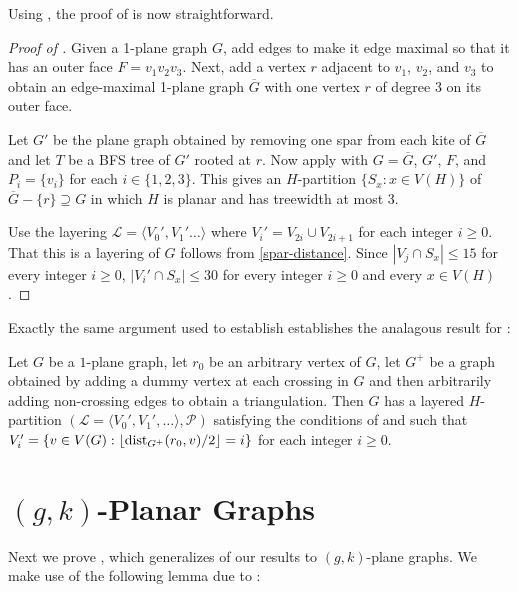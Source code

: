 \documentclass{patmorin}
\DeclareMathOperator{\dist}{dist}
\begin{document}
Using , the proof of  is now straightforward. 

\begin{proof}[Proof of ]
Given a 1-plane graph $G$, add edges to make it edge maximal so that it has an outer face $F=v_1v_2v_3$. Next, add a vertex $r$ adjacent to $v_1$, $v_2$, and $v_3$ to obtain an edge-maximal 1-plane graph $\overline{G}$ with one vertex $r$ of degree 3 on its outer face. 
  
  Let $G'$ be the plane graph obtained by removing one spar from each kite of $\overline{G}$ and let $T$ be a BFS tree of $G'$ rooted at $r$.  Now apply  with $G=\overline{G}$, $G'$, $F$, and $P_i=\{v_i\}$ for each $i\in\{1,2,3\}$.  This gives an $H$-partition $\{S_x:x\in V(H)\}$ of $\overline{G}-\{r\}\supseteq G$ in which $H$ is planar and has treewidth at most 3.
  
  Use the layering $\mathcal{L}=\langle V_0',V_1'\ldots\rangle$ where $V_i'=V_{2i}\cup V_{2i+1}$ for each integer $i\ge 0$. That this is a layering of $G$ follows from \eqref{spar-distance}.  Since $|V_j\cap S_x|\le 15$ for every integer $i\ge 0$, $|V_i'\cap S_x|\le 30$ for every integer $i\ge 0$ and every $x\in V(H)$.
\end{proof}


Exactly the same argument used to establish  establishes the analagous result for :

\begin{cor}
  Let $G$ be a $1$-plane graph, let $r_0$ be an arbitrary vertex of $G$, let $G^+$ be a graph obtained by adding a dummy vertex at each crossing in $G$ and then arbitrarily adding non-crossing edges to obtain a triangulation.  Then $G$ has a layered $H$-partition $(\mathcal{L}=\langle V_0',V_1',\ldots\rangle,\mathcal{P})$ satisfying the conditions of  and such that $V_i' = \{v\in V(G): \floor{\dist_{G^+}(r_0,v)/2}=i\}$ for each integer $i\ge 0$.
\end{cor}


\section{$(g,k)$-Planar Graphs}

Next we prove , which generalizes of our results to $(g,k)$-plane graphs.  We make use of the following lemma due to \citet[Lemma~21]{dujmovic.joret.ea:planar}:
\end{document}
